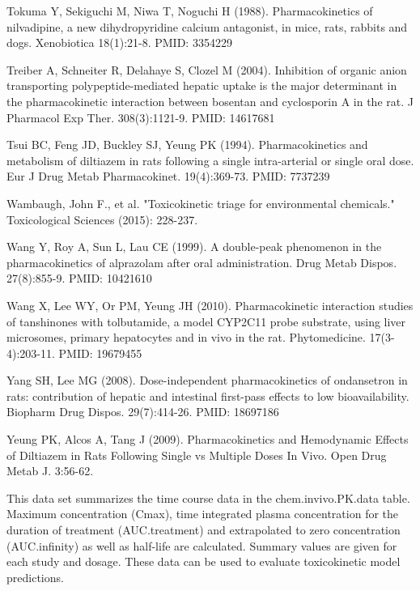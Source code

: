 \documentclass[a4paper]{book}
\begin{document}
\begin{References}
Tokuma Y, Sekiguchi M, Niwa T, Noguchi H (1988). Pharmacokinetics of
nilvadipine, a new dihydropyridine calcium antagonist, in mice, rats,
rabbits and dogs. Xenobiotica 18(1):21-8. PMID: 3354229

Treiber A, Schneiter R, Delahaye S, Clozel M (2004). Inhibition of organic
anion transporting polypeptide-mediated hepatic uptake is the major
determinant in the pharmacokinetic interaction between bosentan and
cyclosporin A in the rat. J Pharmacol Exp Ther. 308(3):1121-9. PMID:
14617681

Tsui BC, Feng JD, Buckley SJ, Yeung PK (1994). Pharmacokinetics and
metabolism of diltiazem in rats following a single intra-arterial or single
oral dose. Eur J Drug Metab Pharmacokinet. 19(4):369-73. PMID: 7737239

Wambaugh, John F., et al. "Toxicokinetic triage for environmental
chemicals." Toxicological Sciences (2015): 228-237.

Wang Y, Roy A, Sun L, Lau CE (1999). A double-peak phenomenon in the
pharmacokinetics of alprazolam after oral administration. Drug Metab Dispos.
27(8):855-9. PMID: 10421610

Wang X, Lee WY, Or PM, Yeung JH (2010). Pharmacokinetic interaction studies
of tanshinones with tolbutamide, a model CYP2C11 probe substrate, using
liver microsomes, primary hepatocytes and in vivo in the rat. Phytomedicine.
17(3-4):203-11. PMID: 19679455

Yang SH, Lee MG (2008). Dose-independent pharmacokinetics of ondansetron in
rats: contribution of hepatic and intestinal first-pass effects to low
bioavailability. Biopharm Drug Dispos. 29(7):414-26. PMID: 18697186

Yeung PK, Alcos A, Tang J (2009). Pharmacokinetics and Hemodynamic Effects
of Diltiazem in Rats Following Single vs Multiple Doses In Vivo. Open Drug
Metab J. 3:56-62.
\end{References}
%
\begin{Description}\relax
This data set summarizes the time course data in the chem.invivo.PK.data
table. Maximum concentration (Cmax), time integrated plasma concentration
for the duration of treatment (AUC.treatment) and extrapolated to zero
concentration (AUC.infinity) as well as half-life are calculated. Summary
values are given for each study and dosage. These data can be used to
evaluate toxicokinetic model predictions.
\end{Description}
\end{document}
